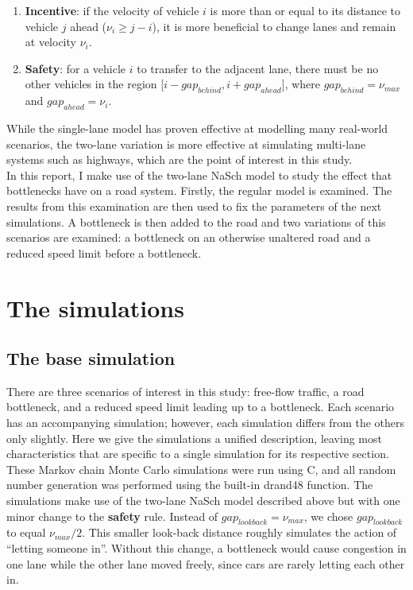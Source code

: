 \documentclass[11pt]{article}
\begin{document}
	\begin{enumerate}
		\item \textbf{Incentive}: if the velocity of vehicle $i$ is more than or equal to its distance to vehicle $j$ ahead ($\nu_i \geq j-i$), it is more beneficial to change lanes and remain at velocity $\nu_i$.
		\item \textbf{Safety}: for a vehicle $i$ to transfer to the adjacent lane, there must be no other vehicles in the region [$i-gap_{behind}, i+gap_{ahead}]$, where $gap_{behind} = \nu_{max}$ and $gap_{ahead} = \nu_i$.
	\end{enumerate}
	
	While the single-lane model has proven effective at modelling many real-world scenarios, the two-lane variation is more effective at simulating multi-lane systems such as highways, which are the point of interest in this study.\\
	
	In this report, I make use of the two-lane NaSch model to study the effect that bottlenecks have on a road system. Firstly, the regular model is examined. The results from this examination are then used to fix the parameters of the next simulations. A bottleneck is then added to the road and two variations of this scenarios are examined: a bottleneck on an otherwise unaltered road and a reduced speed limit before a bottleneck.\\
	
	\section{The simulations}\label{sec:sims}
	
	\subsection{The base simulation}\label{subsec:basesim}
	
	There are three scenarios of interest in this study: free-flow traffic, a road bottleneck, and a reduced speed limit leading up to a bottleneck. Each scenario has an accompanying simulation; however, each simulation differs from the others only slightly. Here we give the simulations a unified description, leaving most characteristics that are specific to a single simulation for its respective section.\\
	
	These Markov chain Monte Carlo simulations were run using C, and all random number generation was performed using the built-in drand48 function. The simulations make use of the two-lane NaSch model described above but with one minor change to the \textbf{safety} rule. Instead of $gap_{lookback} = \nu_{max}$, we chose $gap_{lookback}$ to equal $\nu_{max}/2$. This smaller look-back distance roughly simulates the action of ``letting someone in''. Without this change, a bottleneck would cause congestion in one lane while the other lane moved freely, since cars are rarely letting each other in. \\
	
\end{document}
